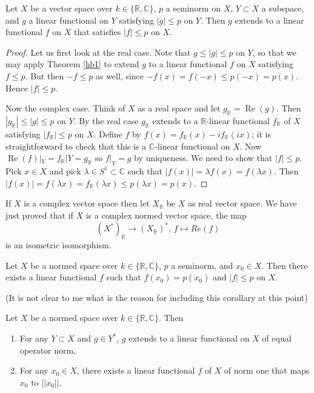 \begin{theorem}\label{hb2}
  Let $X$ be a vector space over $k\in\{\mathbb{R},\mathbb{C}\}$, $p$ a seminorm on $X$,
  $Y\subset X$ a subspace, and $g$ a linear functional on $Y$ satisfying
  $|g|\leq p$ on $Y$.
  Then $g$ extends to a linear functional $f$ on $X$ that satisfies $|f|\leq p$ on $X$.
\end{theorem}

\begin{proof}
Let us first look at the real case.
Note that $g\leq |g|\leq p$ on $Y$,
so that we may apply Theorem \ref{hb1} to extend $g$ to a linear functional $f$ on $X$ satisfying
$f\leq p$. But then $-f\leq p$ as well, since $-f(x)=f(-x)\leq p(-x)=p(x)$.
Hence $|f|\leq p$.

Now the complex case.
Think of $X$ as a real space and let $g_\mathbb{R}=\operatorname{Re}(g)$.
Then $|g_\mathbb{R}|\leq |g|\leq p$ on $Y$.
By the real case $g_\mathbb{R}$ extends to a $\mathbb{R}$-linear functional $f_\mathbb{R}$ of $X$ satisfying
$|f_\mathbb{R}|\leq p$ on $X$.
Define
$f$ by $f(x)=f_\mathbb{R}(x)-if_\mathbb{R}(ix)$;
it is straightforward to check that this is a $\mathbb{C}$-linear functional on $X$.
Now $\operatorname{Re}(f)|_Y=f_{\mathbb{R}}|Y=g_{\mathbb{R}}$ so $f|_Y=g$ by uniqueness.
We need to show that $|f|\leq p$.
Pick $x\in X$ and pick $\lambda\in S^1\subset \mathbb{C}$ such that $|f(x)|=\lambda f(x)=f(\lambda x)$.
Then $|f(x)|=f(\lambda x)=f_\mathbb{R}(\lambda x)\leq p(\lambda x)=p(x)$.
\end{proof}

If $X$ is a complex vector space then let $X_\mathbb{R}$ be $X$ as real vector space.
We have just proved that if $X$ is a complex normed vector space,
the map
$$(X^*)_\mathbb{R}\to(X_\mathbb{R})^*,\,f\mapsto Re(f)$$
is an isometric isomorphism.

\begin{corollary}
  Let $X$ be a normed space over $k\in\{\mathbb{R},\mathbb{C}\}$, $p$ a seminorm,
  and $x_0\in X$. Then there exists a linear functional $f$ such that $f(x_0)=p(x_0)$
  and $|f|\leq p$ on $X$.
\end{corollary}
(It is not clear to me what is the reason for including this corollary at this point)

\begin{theorem}\label{hb4}
  Let $X$ be a normed space over $k\in\{\mathbb{R},\mathbb{C}\}$.
  Then
  \begin{enumerate}
    \item For any $Y\subset X$ and $g\in Y^*$, $g$ extends to a linear functional
    on $X$ of equal operator norm,
    \item For any $x_0\in X$, there exists a linear functional $f$ of $X$
    of norm one that maps $x_0$ to $||x_0||$.
  \end{enumerate}
\end{theorem}

